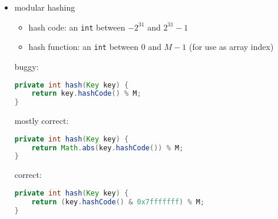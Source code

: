 \documentclass[8pt,a4paper,compress]{beamer}
\begin{document}
\begin{frame}[fragile]
\begin{itemize}
\item modular hashing
\begin{itemize}
\item hash code: an \lstinline{int} between $-2^{31}$ and $2^{31} - 1$

\item hash function: an \lstinline{int} between 0 and $M-1$ (for use as array index)
\end{itemize}

\smallskip

buggy:

\begin{lstlisting}[language=Java]
private int hash(Key key) { 
    return key.hashCode() % M; 
}
\end{lstlisting}

mostly correct:

\begin{lstlisting}[language=Java]
private int hash(Key key) { 
    return Math.abs(key.hashCode()) % M;  
}
\end{lstlisting}


correct:

\begin{lstlisting}[language=Java]
private int hash(Key key) { 
    return (key.hashCode() & 0x7fffffff) % M;
}
\end{lstlisting}
\end{itemize}
\end{frame}
\end{document}
